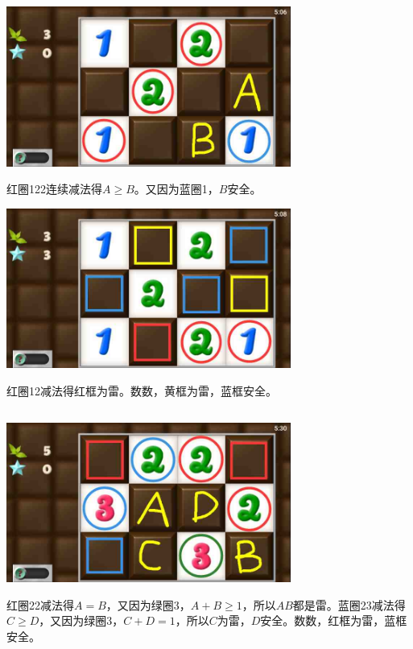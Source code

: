 \subsection{} %
\begin{center}
    \includegraphics[width=0.7\textwidth]{puzzlelow/59-1.jpg}
\end{center}
红圈122连续减法得$A\ge B$。又因为蓝圈1，$B$安全。
\begin{center}
    \includegraphics[width=0.7\textwidth]{puzzlelow/59-2.jpg}
\end{center}
红圈12减法得红框为雷。数数，黄框为雷，蓝框安全。

\subsection{} %
\begin{center}
    \includegraphics[width=0.7\textwidth]{puzzlelow/60-1.jpg}
\end{center}
红圈22减法得$A=B$，又因为绿圈3，$A+B\ge 1$，所以$AB$都是雷。蓝圈23减法得$C\ge D$，又因为绿圈3，$C+D=1$，所以$C$为雷，$D$安全。数数，红框为雷，蓝框安全。

